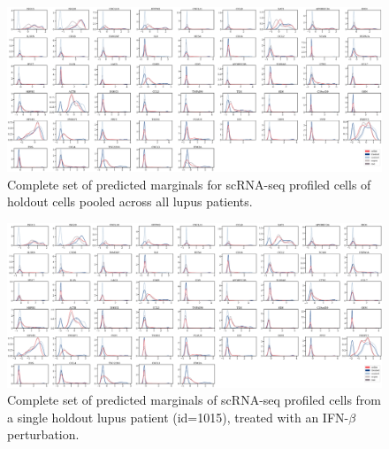 \begin{figure}[t!]
{%
}
\end{figure}

\begin{figure}[H]
    \centering
    \includegraphics[width=\textwidth]{figures/cellot-methods/Bunne_Supp_Fig9.png}
    \caption{Complete set of predicted marginals for scRNA-seq profiled cells of holdout cells pooled across all lupus patients.}
    \label{supp_fig:lupus_all_marginals_iid}
\end{figure}


\begin{figure}[H]
    \centering
    \includegraphics[width=\textwidth]{figures/cellot-methods/Bunne_Supp_Fig10.png} 
    \caption{Complete set of predicted marginals of scRNA-seq profiled cells from a single holdout lupus patient (id=1015), treated with an IFN-$\beta$ perturbation.}
    \label{supp_fig:lupus_all_marginals_ood}
\end{figure}


